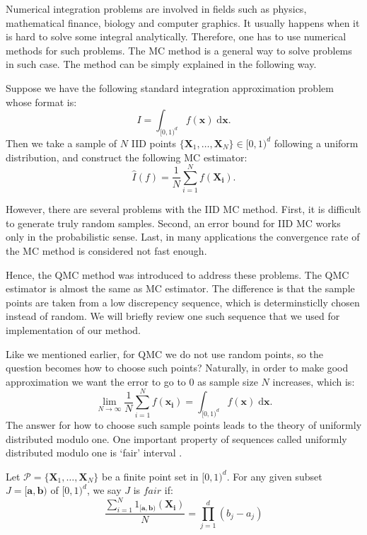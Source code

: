 
Numerical integration problems are involved in fields such as physics, mathematical finance, biology and computer graphics. 
It usually happens when it is hard to solve some integral analytically. Therefore, one has to use numerical methods for such problems.  
The MC method is a general way to solve problems in such case\cite{fishman2013monte}. The method can be simply explained in the following way. 

Suppose we have the following standard integration approximation problem whose format is: 
\begin{equation}
    \label{eq:setup}
    I= \int_{[0,1)^d}f(\mathbf{x})\;\textrm{d}\mathbf{x}.
\end{equation}
Then we take a sample of $N$ IID points $\{\mathbf{X}_1,\dots, \mathbf{X}_N\}\in [0,1)^d$ following a uniform distribution, and construct the following MC estimator:
\[
    \hat{I}(f)=\frac{1}{N}\sum_{i=1}^{N}f(\mathbf{X_i}).
\]

However, there are several problems with the IID MC method\cite{niederreiter2010quasi}.
First, it is difficult to generate truly random samples. Second, an error bound for IID MC works only in the probabilistic sense. 
Last, in many applications the convergence rate of the MC method is considered not fast enough. 

Hence, the QMC method was introduced to address these problems. 
The QMC estimator is almost the same as MC estimator. 
The difference is that the sample points are taken from a low discrepency sequence, which is determinsticlly chosen instead of random.   
We will briefly review one such sequence that we used for implementation of our method. 

\newpage


Like we mentioned earlier, for QMC we do not use random points, so the question becomes how to choose such points?  
Naturally, in order to make good approximation we want the error to go to $0$ as sample size $N$ increases, which is:
\[
    \lim_{N\to\infty}\frac{1}{N}\sum_{i=1}^{N}f(\mathbf{x_i})=\int_{[0,1)^d}f(\mathbf{x})\;\textrm{d}\mathbf{x}.
\]
The answer for how to choose such sample points leads to the theory of uniformly distributed modulo one. One important property of sequences called uniformly distributed modulo one is `fair' interval \cite{dick2010digital}.
\theoremstyle{definition}
\begin{definition}{}
Let $\mathscr{P} =\{\mathbf{X}_1,\dots,\mathbf{X}_N\}$ be a finite point set in $[0, 1)^d$.
            For any given subset $J=[\mathbf{a},\mathbf{b})$ of $[0, 1)^d$, we say $J$ is $\textit{fair}$ if:  
    \[
        \frac{\sum_{i=1}^{N}1_{[\mathbf{a},\mathbf{b})}(\mathbf{X_i})}{N}
            =\prod_{j=1}^{d}(b_j-a_j)
                    \]
\end{definition}

